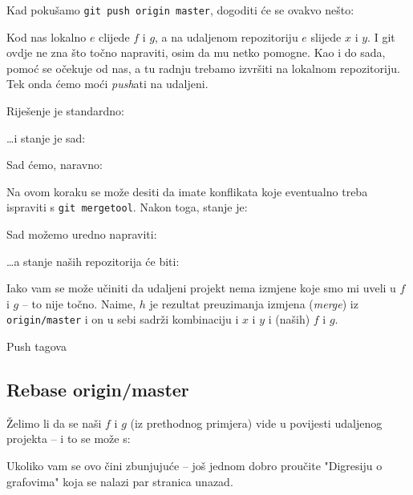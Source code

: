 Kad pokušamo \verb+git push origin master+, dogoditi će se ovakvo nešto:



Kod nas lokalno $e$ clijede $f$ i $g$, a na udaljenom repozitoriju $e$ slijede $x$ i $y$. 
I git ovdje ne zna što točno napraviti, osim da mu netko pomogne.
Kao i do sada, pomoć se očekuje od nas, a tu radnju trebamo izvršiti na lokalnom repozitoriju.
Tek onda ćemo moći \emph{push}ati na udaljeni.

Riješenje je standardno:


\dots{}i stanje je sad:



Sad ćemo, naravno:


Na ovom koraku se može desiti da imate konflikata koje eventualno treba ispraviti s \verb+git mergetool+.
Nakon toga, stanje je:



Sad možemo uredno napraviti:


\dots{}a stanje naših repozitorija će biti:



Iako vam se može učiniti da udaljeni projekt nema izmjene koje smo mi uveli u $f$ i $g$ -- to nije točno.
Naime, $h$ je rezultat preuzimanja izmjena (\emph{merge}) iz \verb+origin/master+ i on u sebi sadrži kombinaciju i $x$ i $y$ i (naših) $f$ i $g$.

\TODO Push tagova

\subsection*{Rebase origin/master}

Želimo li da se naši $f$ i $g$ (iz prethodnog primjera) vide u povijesti udaljenog projekta -- i to se može s:


Ukoliko vam se ovo čini zbunjujuće -- još jednom dobro proučite "Digresiju o grafovima" koja se nalazi par stranica unazad.

